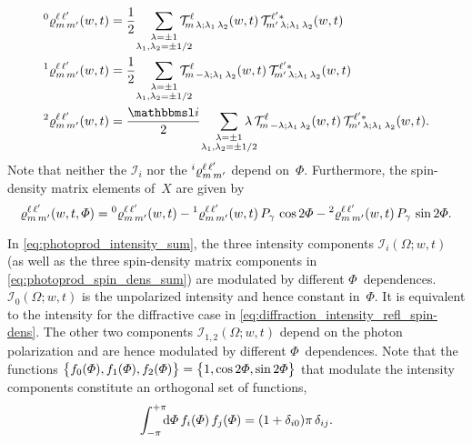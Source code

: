 \begin{align}
  \label{eq:photoprod_rho_0}
  \prescript{0}{}{\varrho}^{\ell\, \ell'}_{m\, m'}(w, t)
  ={}& \frac{1}{2}\quad \sum_{\substack{\lambda = \pm 1 \\ \mathclap{\lambda_1, \lambda_2 = \pm 1/2}}}
  \mathcal{T}^\ell_{\!m\, \lambda; \lambda_1\, \lambda_2}(w, t)\,
  \mathcal{T}^{\ell' *}_{\!m'\, \lambda; \lambda_1\, \lambda_2}(w, t)
  \\
  \label{eq:photoprod_rho_1}
  \prescript{1}{}{\varrho}^{\ell\, \ell'}_{m\, m'}(w, t)
  ={}& \frac{1}{2}\quad \sum_{\substack{\lambda = \pm 1 \\ \mathclap{\lambda_1, \lambda_2 = \pm 1/2}}}
  \mathcal{T}^\ell_{\!m\, {-\lambda}; \lambda_1\, \lambda_2}(w, t)\,
  \mathcal{T}^{\ell' *}_{\!m'\, \lambda; \lambda_1\, \lambda_2}(w, t)
  \\
  \label{eq:photoprod_rho_2}
  \prescript{2}{}{\varrho}^{\ell\, \ell'}_{m\, m'}(w, t)
  ={}& \frac{\imag}{2}\quad \sum_{\substack{\lambda = \pm 1 \\ \mathclap{\lambda_1, \lambda_2 = \pm 1/2}}}
  \lambda\,
  \mathcal{T}^\ell_{\!m\, {-\lambda}; \lambda_1\, \lambda_2}(w, t)\,
  \mathcal{T}^{\ell' *}_{\!m'\, \lambda; \lambda_1\, \lambda_2}(w, t).
\end{align}
Note that neither the $\mathcal{I}_i$ nor the
$\prescript{i}{}{\varrho}^{\ell\, \ell'}_{m\, m'}$ depend on~$\Phi$.
Furthermore, the spin-density matrix elements of~$X$ are given by
\begin{equation}
  \label{eq:photoprod_spin_dens_sum}
  \varrho^{\ell\, \ell'}_{m\, m'}(w, t, \Phi)
  = \prescript{0}{}{\varrho}^{\ell\, \ell'}_{m\, m'}(w, t)
  - \prescript{1}{}{\varrho}^{\ell\, \ell'}_{m\, m'}(w, t)\, P_\gamma\, \cos 2 \Phi
  - \prescript{2}{}{\varrho}^{\ell\, \ell'}_{m\, m'}(w, t)\, P_\gamma\, \sin 2 \Phi.
\end{equation}

In \cref{eq:photoprod_intensity_sum}, the three intensity components
$\mathcal{I}_i(\Omega; w, t)$ (as well as the three spin-density
matrix components in \cref{eq:photoprod_spin_dens_sum}) are modulated
by different $\Phi$~dependences.  $\mathcal{I}_0(\Omega; w, t)$ is the
unpolarized intensity and hence constant in~$\Phi$.  It is equivalent
to the intensity for the diffractive case in
\cref{eq:diffraction_intensity_refl_spin-dens}.  The other two
components $\mathcal{I}_{1, 2}(\Omega; w, t)$ depend on the photon
polarization and are hence modulated by different $\Phi$~dependences.
Note that the functions $\cBrk[1]{f_0(\Phi), f_1(\Phi), f_2(\Phi)} =
\cBrk[1]{1, \cos 2 \Phi, \sin 2 \Phi}$ that modulate the intensity
components constitute an orthogonal set of functions, \ie
\begin{equation}
  \label{eq:photoprod_orthogonality_phi}
  \int_{-\pi}^{+\pi}\!\!\! \dif{\Phi}\, f_i(\Phi)\, f_j(\Phi)
  = (1 + \delta_{i 0}) \pi\, \delta_{i j}.
\end{equation}

